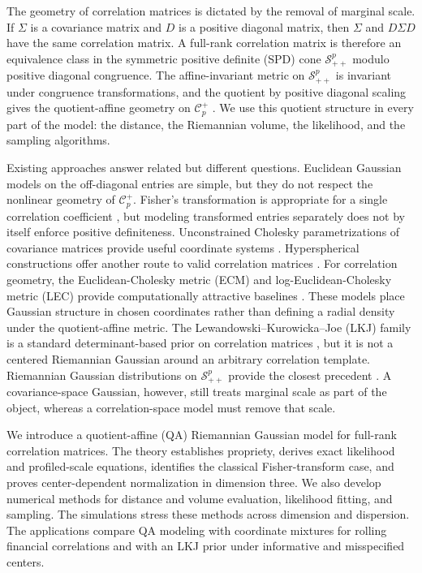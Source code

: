 \documentclass[
  12pt]{article}
\newcommand{\SPD}{\mathcal S_{++}}
\newcommand{\Corr}{\mathcal C^+}
\begin{document}
The geometry of correlation matrices is dictated by the removal of marginal scale. If $\Sigma$ is a covariance matrix and $D$ is a positive diagonal matrix, then $\Sigma$ and $D\Sigma D$ have the same correlation matrix. A full-rank correlation matrix is therefore an equivalence class in the symmetric positive definite (SPD) cone $\SPD^p$ modulo positive diagonal congruence. The affine-invariant metric on $\SPD^p$ is invariant under congruence transformations, and the quotient by positive diagonal scaling gives the quotient-affine geometry on $\Corr_p$ \citep{david_2019_RiemannianStructureCorrelation, thanwerdas_2021_GeodesicQuotientAffineMetrics}. We use this quotient structure in every part of the model: the distance, the Riemannian volume, the likelihood, and the sampling algorithms.

Existing approaches answer related but different questions. Euclidean Gaussian models on the off-diagonal entries are simple, but they do not respect the nonlinear geometry of $\Corr_p$. Fisher's transformation is appropriate for a single correlation coefficient \citep{fisher_probable_1921}, but modeling transformed entries separately does not by itself enforce positive definiteness. Unconstrained Cholesky parametrizations of covariance matrices provide useful coordinate systems \citep{pinheiro_1996_UnconstrainedParametrizationsVariancecovariance,pourahmadi_1999_JointMeancovarianceModels}. Hyperspherical constructions offer another route to valid correlation matrices \citep{rebonato_2011_MostGeneralMethodology}. For correlation geometry, the Euclidean-Cholesky metric (ECM) and log-Euclidean-Cholesky metric (LEC) provide computationally attractive baselines \citep{thanwerdas_2022_TheoreticallyComputationallyConvenient}. These models place Gaussian structure in chosen coordinates rather than defining a radial density under the quotient-affine metric. The Lewandowski--Kurowicka--Joe (LKJ) family is a standard determinant-based prior on correlation matrices \citep{lewandowski_2009_GeneratingRandomCorrelation}, but it is not a centered Riemannian Gaussian around an arbitrary correlation template. Riemannian Gaussian distributions on $\SPD^p$ provide the closest precedent \cite{said_2017_RiemannianGaussianDistributions}. A covariance-space Gaussian, however, still treats marginal scale as part of the object, whereas a correlation-space model must remove that scale.

We introduce a quotient-affine (QA) Riemannian Gaussian model for full-rank correlation matrices. The theory establishes propriety, derives exact likelihood and profiled-scale equations, identifies the classical Fisher-transform case, and proves center-dependent normalization in dimension three. We also develop numerical methods for distance and volume evaluation, likelihood fitting, and sampling. The simulations stress these methods across dimension and dispersion. The applications compare QA modeling with coordinate mixtures for rolling financial correlations and with an LKJ prior under informative and misspecified centers.
\end{document}
